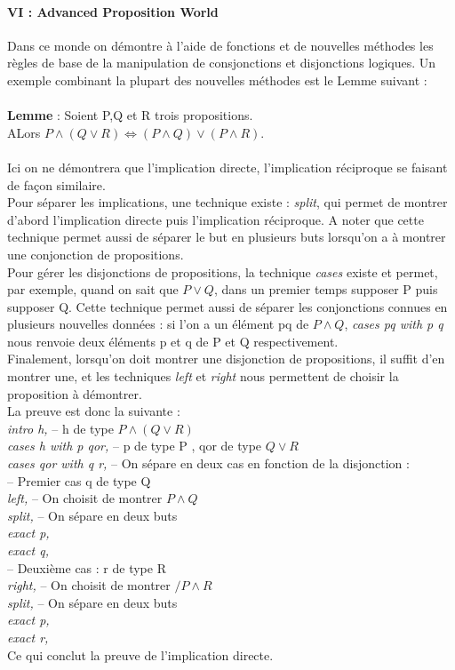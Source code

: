\documentclass[french,frenchkw]{article}
\begin{document}
\paragraph{VI : Advanced Proposition World}
Dans ce monde on démontre à l'aide de fonctions et de nouvelles méthodes les règles de base de la manipulation de consjonctions et disjonctions logiques. Un exemple combinant la plupart des nouvelles méthodes est le Lemme suivant : \\
\\
\textbf{Lemme} : Soient P,Q et R trois propositions. \\
ALors $P\land(Q\lor R) \Longleftrightarrow (P\land Q)\lor(P\land R)$.\\
\\
Ici on ne démontrera que l'implication directe, l'implication réciproque se faisant de façon similaire.\\
Pour séparer les implications, une technique existe : \textit{split}, qui permet de montrer d'abord l'implication directe puis l'implication réciproque. A noter que cette technique permet aussi de séparer le but en plusieurs buts lorsqu'on a à montrer une conjonction de propositions.\\
Pour gérer les disjonctions de propositions, la technique \textit{cases} existe et permet, par exemple, quand on sait que $P\lor Q$, dans un premier temps supposer P puis supposer Q. Cette technique permet aussi de séparer les conjonctions connues en plusieurs nouvelles données : si l'on a un élément pq de $P\land Q$, \textit{cases pq with p q} nous renvoie deux éléments p et q de P et Q respectivement.\\
Finalement, lorsqu'on doit montrer une disjonction de propositions, il suffit d'en montrer une, et les techniques \textit{left} et \textit{right} nous permettent de choisir la proposition à démontrer.\\
La preuve est donc la suivante : \\
\textit{intro h,}     -- h de type $P\land (Q\lor R)$\\ 
\textit{cases h with p qor,}     -- p de type P , qor de type $Q\lor R$\\
\textit{cases qor with q r,}     -- On sépare en deux cas en fonction de la disjonction :\\ 

-- Premier cas q de type Q\\
\textit{left, }   -- On choisit de montrer $P\land Q$\\
\textit{split,}     -- On sépare en deux buts\\
\textit{exact p,}\\
\textit{exact q,}\\

-- Deuxième cas : r de type R\\
\textit{right, }     -- On choisit de montrer $/P\land R$\\
\textit{split,}     -- On sépare en deux buts\\
\textit{exact p,}\\
\textit{exact r,}\\
Ce qui conclut la preuve de l'implication directe.


\end{document}

